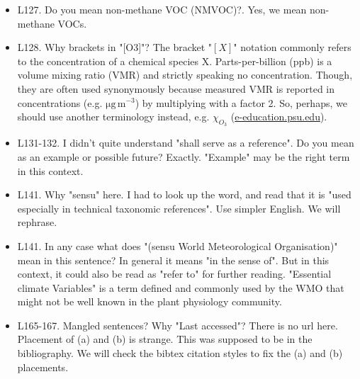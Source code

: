 \documentclass{scrartcl}
\begin{document}
\begin{itemize}
\item {\color{blue}L127. Do you mean non-methane VOC (NMVOC)?.} Yes, we mean non-methane VOCs.

\item {\color{blue}L128. Why brackets in "[O3]"?}
The bracket "$[X]$" notation commonly refers to the concentration of a chemical species X. Parts-per-billion (ppb) is a volume mixing ratio (VMR) and strictly speaking no concentration. Though, they are often used synonymously because measured VMR is reported in concentrations (e.g. $\mathrm{\mu g\,m^{-3}}$) by multiplying with a factor 2. So, perhaps, we should use another terminology instead, e.g. $\chi_{O_3}$ (\href{https://www.e-education.psu.edu/meteo300/node/534}{e-education.psu.edu}).

\item {\color{blue}L131-132. I didn't quite understand "shall serve as a reference". Do you mean as an example or possible future?}
Exactly. "Example" may be the right term in this context. 

\item {\color{blue}L141. Why "sensu" here. I had to look up the word, and read that it is "used especially in technical taxonomic references". Use simpler English.}
We will rephrase.

\item {\color{blue}L141. In any case what does "(sensu World Meteorological Organisation)" mean in this sentence?}
In general it means "in the sense of". But in this context, it could also be read as "refer to" for further reading. "Essential climate Variables" is a term defined and commonly used by the WMO that might not be well known in the plant physiology community.

\item {\color{blue}L165-167. Mangled sentences? Why "Last accessed"? There is no url here. Placement of (a) and (b) is strange.}
This was supposed to be in the bibliography. We will check the bibtex citation styles to fix the (a) and (b) placements.


\end{itemize}
\end{document}
